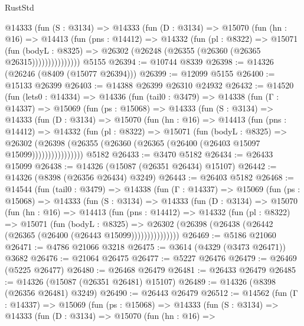 \begin{lexlean}{RustStd}
\begin{coremodule}
            @14333
              (fun (S : @3134) =>
              @14333
                (fun (D : @3134) =>
                @15070
                  (fun (hn : @16) =>
                  @14413
                    (fun (pns : @14412) =>
                    @14332
                      (fun (pl : @8322) =>
                      @15071
                        (fun (bodyL : @8325) =>
                        @26302 (@26248 (@26355 (@26360 (@26365 @26315)))))))))))))))
    @5155
@26394 := @10744 @8339
@26398 := @14326 (@26246 (@8409 (@15077 @26394)))
@26399 := @12099 @5155
@26400 := @15133 @26399
@26403 := @14388 @26399 @26310 @24932
@26432 := @14520
    (fun (lets0 : @14334) =>
    @14336
      (fun (tail0 : @3479) =>
      @14338
        (fun (Γ : @14337) =>
        @15069
          (fun (ps : @15068) =>
          @14333
            (fun (S : @3134) =>
            @14333
              (fun (D : @3134) =>
              @15070
                (fun (hn : @16) =>
                @14413
                  (fun (pns : @14412) =>
                  @14332
                    (fun (pl : @8322) =>
                    @15071
                      (fun (bodyL : @8325) =>
                      @26302
                        (@26398
                          (@26355 (@26360 (@26365 (@26400 (@26403 @15097 @15099))))))))))))))))
    @5182
@26433 := @3470 @5182
@26434 := @26433 @15099
@26438 := @14326 (@15087 (@26351 @26434) @15107)
@26442 := @14326 (@8398 (@26356 @26434) @3249)
@26443 := @26403 @5182
@26468 := @14544
    (fun (tail0 : @3479) =>
    @14338
      (fun (Γ : @14337) =>
      @15069
        (fun (ps : @15068) =>
        @14333
          (fun (S : @3134) =>
          @14333
            (fun (D : @3134) =>
            @15070
              (fun (hn : @16) =>
              @14413
                (fun (pns : @14412) =>
                @14332
                  (fun (pl : @8322) =>
                  @15071
                    (fun (bodyL : @8325) =>
                    @26302 (@26398 (@26438 (@26442 (@26365 (@26400 (@26443 @15099)))))))))))))))
@26469 := @5186 @21060
@26471 := @4786 @21066 @3218
@26475 := @3614 (@4329 (@3473 @26471)) @3682
@26476 := @21064 @26475
@26477 := @5227 @26476
@26479 := @26469 (@5225 @26477)
@26480 := @26468 @26479
@26481 := @26433 @26479
@26485 := @14326 (@15087 (@26351 @26481) @15107)
@26489 := @14326 (@8398 (@26356 @26481) @3249)
@26490 := @26443 @26479
@26512 := @14562
    (fun (Γ : @14337) =>
    @15069
      (fun (ps : @15068) =>
      @14333
        (fun (S : @3134) =>
        @14333
          (fun (D : @3134) =>
          @15070
            (fun (hn : @16) =>

\end{coremodule}
\end{lexlean}
